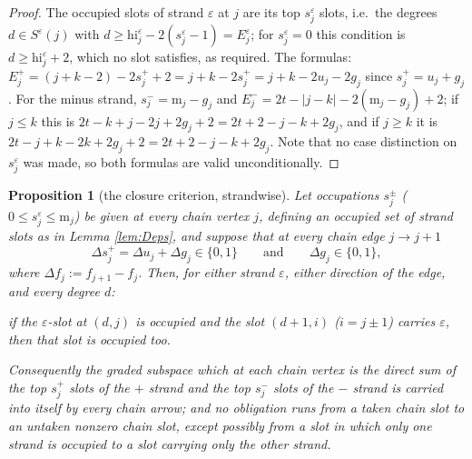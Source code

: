 \documentclass[reqno]{amsart}
\theoremstyle{plain}
\newtheorem{proposition}[theorem]{Proposition}
\theoremstyle{definition}
\newcommand{\eps}{\varepsilon}
\newcommand{\hi}{\mathrm{hi}}
\newcommand{\ms}{\mathrm{m}}
\begin{document}
\begin{proof}
The occupied slots of strand $\eps$ at $j$ are its top $s^{\eps}_j$ slots,
i.e.\ the degrees $d\in S^{\eps}(j)$ with
$d\ge\hi^{\eps}_j-2(s^{\eps}_j-1)=E^{\eps}_j$; for $s^{\eps}_j=0$ this
condition is $d\ge\hi^{\eps}_j+2$, which no slot satisfies, as required.  The
formulas: $E^+_j=(j+k-2)-2s^+_j+2=j+k-2s^+_j=j+k-2u_j-2g_j$ since
$s^+_j=u_j+g_j$.  For the minus strand, $s^-_j=\ms_j-g_j$ and
$E^-_j=2t-|j-k|-2(\ms_j-g_j)+2$; if $j\le k$ this is
$2t-k+j-2j+2g_j+2=2t+2-j-k+2g_j$, and if $j\ge k$ it is
$2t-j+k-2k+2g_j+2=2t+2-j-k+2g_j$.  Note that no case distinction on
$s^{\eps}_j$ was made, so both formulas are valid unconditionally.
\end{proof}

\begin{proposition}[the closure criterion, strandwise]\label{prop:crit}
Let occupations $s^{\pm}_j$ ($0\le s^{\eps}_j\le \ms_j$) be given at every chain
vertex $j$, defining an occupied set of strand slots as in Lemma
\ref{lem:Deps}, and suppose that at every chain edge $j\to j+1$
\begin{equation}\label{eq:twobounds}
   \Delta s^{+}_j=\Delta u_j+\Delta g_j\in\{0,1\}
   \qquad\text{and}\qquad
   \Delta g_j\in\{0,1\},
\end{equation}
where $\Delta f_j:=f_{j+1}-f_j$.  Then, for either strand $\eps$, either
direction of the edge, and every degree $d$:
\begin{center}
\emph{if the $\eps$-slot at $(d,j)$ is occupied and the slot $(d+1,i)$
\textup{(}$i=j\pm1$\textup{)} carries $\eps$, then that slot is occupied too.}
\end{center}
Consequently the graded subspace which at each chain vertex is the direct sum
of the top $s^{+}_j$ slots of the $+$ strand and the top $s^{-}_j$ slots of
the $-$ strand is carried into itself by every chain arrow; and no obligation
runs from a \emph{taken} chain slot to an \emph{untaken} nonzero chain slot,
except possibly from a slot in which only one strand is occupied to a slot
carrying only the other strand.
\end{proposition}
\end{document}
